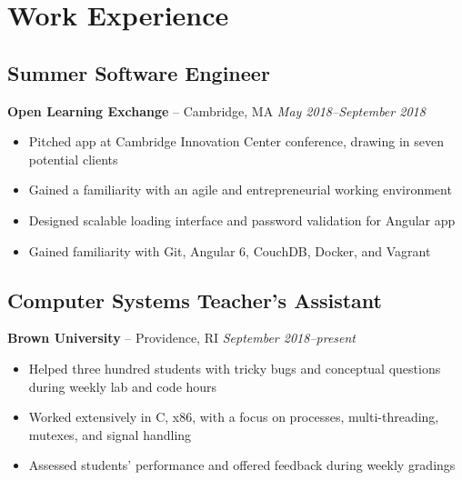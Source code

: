 \documentclass[11pt]{article}
\begin{document}
\section{Work Experience} 
\subsection{Summer Software Engineer} 
\textbf{Open Learning Exchange} -- Cambridge, MA \hfill \textit{May 2018--September 2018}
\begin{itemize}
	\item Pitched app at Cambridge Innovation Center conference, drawing in seven potential clients
	\item Gained a familiarity with an agile and entrepreneurial working environment
	\item Designed scalable loading interface and password validation for Angular app
	\item Gained familiarity with Git, Angular 6, CouchDB, Docker, and Vagrant
\end{itemize}

\subsection{Computer Systems Teacher's Assistant}
\textbf{Brown University} -- Providence, RI \hfill \textit{September 2018--present}

\begin{itemize}
	\item Helped three hundred students with tricky bugs and conceptual questions during weekly lab and code hours
	\item Worked extensively in C, x86, with a focus on processes, multi-threading, mutexes, and signal handling
	\item Assessed students' performance and offered feedback during weekly gradings
\end{itemize}

\end{document}
